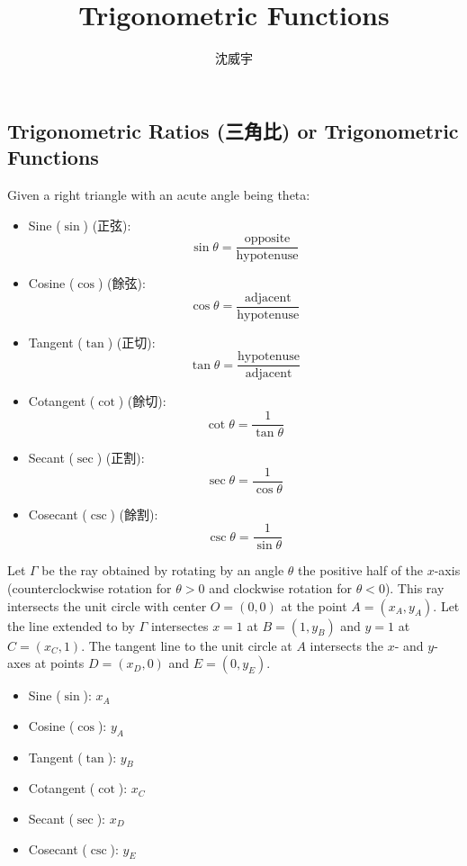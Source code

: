 \documentclass[a4paper,12pt]{report}
\begin{document}
\title{Trigonometric Functions}
\author{沈威宇}
\date{\temtoday}
\titletocdoc
{}
\subsection{Trigonometric Ratios (三角比) or Trigonometric Functions}
Given a right triangle with an acute angle being theta:
\begin{itemize}
  \item Sine ($\sin$) (正弦):
      \[\sin \theta = \frac{\text{opposite}}{\text{hypotenuse}}\]
  \item Cosine ($\cos$) (餘弦):
      \[\cos \theta = \frac{\text{adjacent}}{\text{hypotenuse}}\]
  \item Tangent ($\tan$) (正切):
      \[\tan \theta = \frac{\text{hypotenuse}}{\text{adjacent}}\]
  \item Cotangent ($\cot$) (餘切):
      \[\cot \theta = \frac{1}{\tan \theta}\]
  \item Secant ($\sec$) (正割):
      \[\sec \theta = \frac{1}{\cos \theta}\]
  \item Cosecant ($\csc$) (餘割):
      \[\csc \theta = \frac{1}{\sin \theta}\]
\end{itemize}
Let $\Gamma$ be the ray obtained by rotating by an angle $\theta$ the positive half of the $x$-axis (counterclockwise rotation for $\theta>0$ and clockwise rotation for $\theta<0$). This ray intersects the unit circle with center $O=(0,0)$ at the point $A=(x_A,y_A)$. Let the line extended to by $\Gamma$ intersectes $x=1$ at $B=(1,y_B)$ and $y=1$ at $C=(x_C,1)$. The tangent line to the unit circle at $A$ intersects the $x$- and $y$-axes at points $D=(x_D,0)$ and $E=(0,y_E)$.
\begin{itemize}
    \item Sine ($\sin$): $x_A$
    \item Cosine ($\cos$): $y_A$
    \item Tangent ($\tan$): $y_B$
    \item Cotangent ($\cot$): $x_C$
    \item Secant ($\sec$): $x_D$
  \item Cosecant ($\csc$): $y_E$
\end{itemize} 
\end{document}
